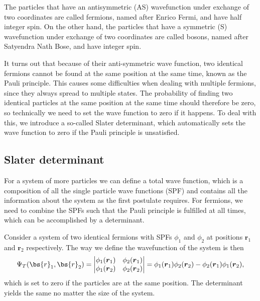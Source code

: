 The particles that have an antisymmetric (AS) wavefunction under exchange of two coordinates are called fermions, named after Enrico Fermi, and have half integer spin. On the other hand, the particles that have a symmetric (S) wavefunction under exchange of two coordinates are called bosons, named after Satyendra Nath Bose, and have integer spin. 

It turns out that because of their anti-symmetric wave function, two identical fermions cannot be found at the same position at the same time, known as the Pauli principle. This causes some difficulties when dealing with multiple fermions, since they always spread to multiple states. The probability of finding two identical particles at the same position at the same time should therefore be zero, so technically we need to set the wave function to zero if it happens. To deal with this, we introduce a so-called Slater determinant, which automatically sets the wave function to zero if the Pauli principle is unsatisfied.

\subsection{Slater determinant} \label{subsec:slater}
For a system of more particles we can define a total wave function, which is a composition of all the single particle wave functions (SPF) and contains all the information about the system as the first postulate requires. For fermions, we need to combine the SPFs such that the Pauli principle is fulfilled at all times, which can be accomplished by a determinant. 

Consider a system of two identical fermions with SPFs $\phi_1$ and $\phi_2$ at positions $\boldsymbol{r}_1$ and $\boldsymbol{r}_2$ respectively. The way we define the wavefunction of the system is then
\begin{equation}
\Psi_T(\bs{r}_1,\bs{r}_2)=
\begin{vmatrix}
\phi_1(\boldsymbol{r}_1) & \phi_2(\boldsymbol{r}_1)\\
\phi_1(\boldsymbol{r}_2) & \phi_2(\boldsymbol{r}_2)
\end{vmatrix}
=\phi_1(\boldsymbol{r}_1)\phi_2(\boldsymbol{r}_2)-\phi_2(\boldsymbol{r}_1)\phi_1(\boldsymbol{r}_2),
\end{equation}
which is set to zero if the particles are at the same position. The determinant yields the same no matter the size of the system.

